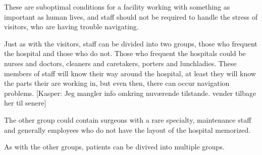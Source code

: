 \begin{Interessents - Users}
These are suboptimal conditions for a facility working with something as important as human lives, and staff should not be required to handle the stress of visitors, who are having trouble navigating.

\item[Staff] Just as with the visitors, staff can be divided into two groups, those who frequent the hospital and those who do not. Those who frequent the hospitals could be nurses and doctors, cleaners and caretakers, porters and lunchladies. These members of staff will know their way around the hospital, at least they will know the parts their are working in, but even then, there can occur navigation problems. [Kasper: Jeg mangler info omkring nuværende tilstande. vender tilbage her til senere]

The other group could contain surgeons with a rare specialty, maintenance staff and generally employees who do not have the layout of the hospital memorized.

\item[Patients] As with the other groups, patients can be divived into multiple groups. 

\item[]


\end{Interessents - Users}

